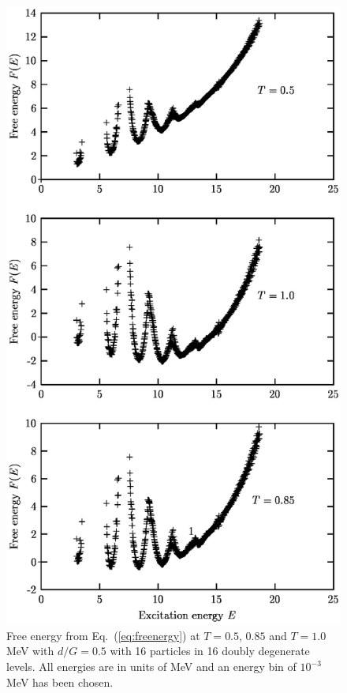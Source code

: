 \documentclass[rmp,aps,floatfix]{revtex4}
\begin{document}
\begin{figure}
\includegraphics[scale=0.5,angle=0]{dean_hjorthjensen_fig31.ps}
\caption{Free energy from Eq.~(\ref{eq:freenergy}) at $T=0.5$, $0.85$ and
         $T=1.0$ MeV  with 
         $d/G=0.5$ with 16 particles in 16 doubly degenerate
         levels. All energies are in units of MeV and 
         an energy bin of $10^{-3}$ MeV has been chosen.}
\label{fig:free_energy16}
\end{figure}
\end{document}
